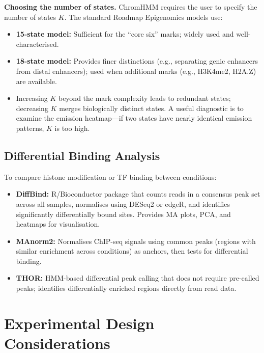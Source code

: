 \textbf{Choosing the number of states.} ChromHMM requires the user to specify the number of states $K$. The standard Roadmap Epigenomics models use:
\begin{itemize}[itemsep=2pt]
  \item \textbf{15-state model:} Sufficient for the ``core six'' marks; widely used and well-characterised.
  \item \textbf{18-state model:} Provides finer distinctions (e.g., separating genic enhancers from distal enhancers); used when additional marks (e.g., H3K4me2, H2A.Z) are available.
  \item Increasing $K$ beyond the mark complexity leads to redundant states; decreasing $K$ merges biologically distinct states. A useful diagnostic is to examine the emission heatmap---if two states have nearly identical emission patterns, $K$ is too high.
\end{itemize}

\subsection{Differential Binding Analysis}
\label{subsec:histones:diffbind}

To compare histone modification or TF binding between conditions:

\begin{itemize}[itemsep=2pt]
  \item \textbf{DiffBind:} R/Bioconductor package that counts reads in a consensus peak set across all samples, normalises using DESeq2 or edgeR, and identifies significantly differentially bound sites. Provides MA plots, PCA, and heatmaps for visualisation.
  \item \textbf{MAnorm2:} Normalises ChIP-seq signals using common peaks (regions with similar enrichment across conditions) as anchors, then tests for differential binding.
  \item \textbf{THOR:} HMM-based differential peak calling that does not require pre-called peaks; identifies differentially enriched regions directly from read data.
\end{itemize}

\section{Experimental Design Considerations}
\label{sec:histones:design}

